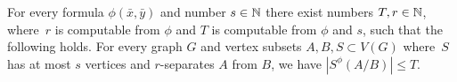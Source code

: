 %
\begin{corollary}[$\star$]\label{cor:bound}
For every formula $\phi(\bar x,\bar y)$ 
and number $s\in \mathbb{N}$
there exist numbers $T,r\in \mathbb{N}$,
where~$r$ is computable from $\phi$ and $T$ is computable from $\phi$ and $s$,
  such that the following holds. For every graph $G$ and vertex subsets $A,B,S\subset V(G)$ 
  where~$S$ has at most $s$ vertices and $r$-separates $A$ from $B$, we have $|S^\phi(A/B)|\le T$.
\end{corollary}
%
%
%
%
